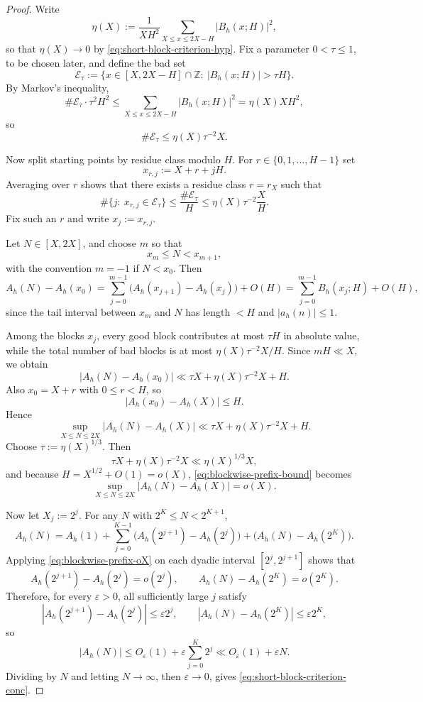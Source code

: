 \documentclass[11pt]{scrartcl}
\numberwithin{equation}{section}
\theoremstyle{definition}
\newcommand{\Z}{\mathbb Z}
\newcommand{\1}{\mathbf 1}
\newcommand{\abs}[1]{\left|#1\right|}
\begin{document}
\begin{proof}
Write
\[
\eta(X):=\frac{1}{XH^2}\sum_{X\le x\le 2X-H}\abs{B_h(x;H)}^2,
\]
so that $\eta(X)\to 0$ by \eqref{eq:short-block-criterion-hyp}. Fix a parameter $0<\tau\le 1$, to be chosen later, and define the bad set
\[
\mathcal E_\tau:=\{x\in [X,2X-H]\cap\Z:\ \abs{B_h(x;H)}>\tau H\}.
\]
By Markov's inequality,
\[
\#\mathcal E_\tau\cdot \tau^2 H^2
\le
\sum_{X\le x\le 2X-H}\abs{B_h(x;H)}^2
=\eta(X)XH^2,
\]
so
\begin{equation}
\label{eq:bad-set-bound}
\#\mathcal E_\tau\le \eta(X)\tau^{-2}X.
\end{equation}

Now split starting points by residue class modulo $H$. For $r\in\{0,1,\dots,H-1\}$ set
\[
x_{r,j}:=X+r+jH.
\]
Averaging over $r$ shows that there exists a residue class $r=r_X$ such that
\[
\#\{j:\ x_{r,j}\in \mathcal E_\tau\}
\le
\frac{\#\mathcal E_\tau}{H}
\le
\eta(X)\tau^{-2}\frac{X}{H}.
\]
Fix such an $r$ and write $x_j:=x_{r,j}$.

Let $N\in[X,2X]$, and choose $m$ so that
\[
x_m\le N < x_{m+1},
\]
with the convention $m=-1$ if $N<x_0$. Then
\[
A_h(N)-A_h(x_0)
=
\sum_{j=0}^{m-1}\bigl(A_h(x_{j+1})-A_h(x_j)\bigr)+O(H)
=
\sum_{j=0}^{m-1} B_h(x_j;H)+O(H),
\]
since the tail interval between $x_m$ and $N$ has length $<H$ and $\abs{a_h(n)}\le 1$.

Among the blocks $x_j$, every good block contributes at most $\tau H$ in absolute value, while the total number of bad blocks is at most $\eta(X)\tau^{-2}X/H$. Since $mH\ll X$, we obtain
\[
\abs{A_h(N)-A_h(x_0)}
\ll
\tau X + \eta(X)\tau^{-2}X + H.
\]
Also $x_0=X+r$ with $0\le r<H$, so
\[
\abs{A_h(x_0)-A_h(X)}\le H.
\]
Hence
\begin{equation}
\label{eq:blockwise-prefix-bound}
\sup_{X\le N\le 2X}\abs{A_h(N)-A_h(X)}
\ll
\tau X + \eta(X)\tau^{-2}X + H.
\end{equation}
Choose $\tau:=\eta(X)^{1/3}$. Then
\[
\tau X + \eta(X)\tau^{-2}X \ll \eta(X)^{1/3}X,
\]
and because $H=X^{1/2}+O(1)=o(X)$, \eqref{eq:blockwise-prefix-bound} becomes
\begin{equation}
\label{eq:blockwise-prefix-oX}
\sup_{X\le N\le 2X}\abs{A_h(N)-A_h(X)}=o(X).
\end{equation}

Now let $X_j:=2^j$. For any $N$ with $2^K\le N<2^{K+1}$,
\[
A_h(N)
=
A_h(1)+\sum_{j=0}^{K-1}\bigl(A_h(2^{j+1})-A_h(2^j)\bigr)+\bigl(A_h(N)-A_h(2^K)\bigr).
\]
Applying \eqref{eq:blockwise-prefix-oX} on each dyadic interval $[2^j,2^{j+1}]$ shows that
\[
A_h(2^{j+1})-A_h(2^j)=o(2^j),
\qquad
A_h(N)-A_h(2^K)=o(2^K).
\]
Therefore, for every $\varepsilon>0$, all sufficiently large $j$ satisfy
\[
\abs{A_h(2^{j+1})-A_h(2^j)}\le \varepsilon 2^j,
\qquad
\abs{A_h(N)-A_h(2^K)}\le \varepsilon 2^K,
\]
so
\[
\abs{A_h(N)}\le O_\varepsilon(1)+\varepsilon\sum_{j=0}^{K}2^j\ll O_\varepsilon(1)+\varepsilon N.
\]
Dividing by $N$ and letting $N\to\infty$, then $\varepsilon\to 0$, gives \eqref{eq:short-block-criterion-conc}.
\end{proof}
\end{document}
